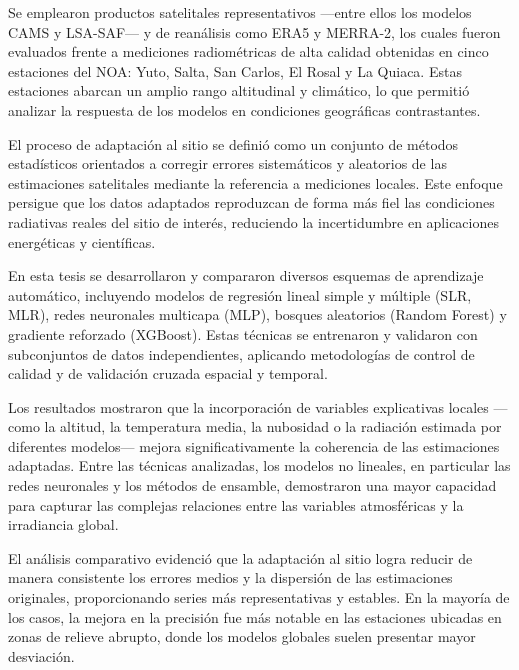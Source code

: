 \documentclass[letterpaper,12pt, twoside]{report}
\providecommand{\DIFdeltex}[1]{{\protect\color{red} \scriptsize #1}} %
\providecommand{\DIFdel}[1]{\texorpdfstring{\DIFdeltex{#1}}{}} %
\begin{document}
\DIFdel{Se emplearon productos satelitales representativos —entre ellos los modelos CAMS y LSA-SAF— y de reanálisis como ERA5 y MERRA-2, los cuales fueron evaluados frente a mediciones radiométricas de alta calidad obtenidas en cinco estaciones del NOA: Yuto, Salta, San Carlos, El Rosal y La Quiaca. Estas estaciones abarcan un amplio rango altitudinal y climático, lo que permitió analizar la respuesta de los modelos en condiciones geográficas contrastantes.
}%

\DIFdel{El proceso de adaptación al sitio se definió como un conjunto de métodos estadísticos orientados a corregir errores sistemáticos y aleatorios de las estimaciones satelitales mediante la referencia a mediciones locales. Este enfoque persigue que los datos adaptados reproduzcan de forma más fiel las condiciones radiativas reales del sitio de interés, reduciendo la incertidumbre en aplicaciones energéticas y científicas.
}%

\DIFdel{En esta tesis se desarrollaron y compararon diversos esquemas de aprendizaje automático, incluyendo modelos de regresión lineal simple y múltiple (SLR, MLR), redes neuronales multicapa (MLP), bosques aleatorios (Random Forest) y gradiente reforzado (XGBoost). Estas técnicas se entrenaron y validaron con subconjuntos de datos independientes, aplicando metodologías de control de calidad y de validación cruzada espacial y temporal.
}%

\DIFdel{Los resultados mostraron que la incorporación de variables explicativas locales —como la altitud, la temperatura media, la nubosidad o la radiación estimada por diferentes modelos— mejora significativamente la coherencia de las estimaciones adaptadas. Entre las técnicas analizadas, los modelos no lineales, en particular las redes neuronales y los métodos de ensamble, demostraron una mayor capacidad para capturar las complejas relaciones entre las variables atmosféricas y la irradiancia global.
}%

\DIFdel{El análisis comparativo evidenció que la adaptación al sitio logra reducir de manera consistente los errores medios y la dispersión de las estimaciones originales, proporcionando series más representativas y estables. En la mayoría de los casos, la mejora en la precisión fue más notable en las estaciones ubicadas en zonas de relieve abrupto, donde los modelos globales suelen presentar mayor desviación.
}%
\end{document}
